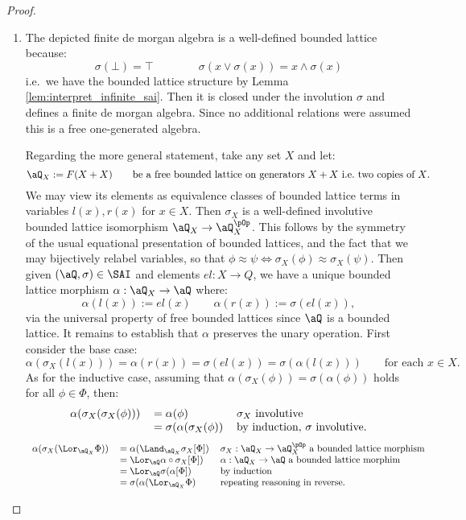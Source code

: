\documentclass{article}
\begin{document}
\begin{proof}
\item
\begin{enumerate}
\item
The depicted finite de morgan algebra is a well-defined bounded lattice because:
\[
\sigma(\bot) = \top
\qquad\qquad
\sigma(x \lor \sigma(x)) = x \land \sigma(x)
\]
i.e.\ we have the bounded lattice structure by Lemma \ref{lem:interpret_infinite_sai}. Then it is closed under the involution $\sigma$ and defines a finite de morgan algebra. Since no additional relations were assumed this is a free one-generated algebra.

\smallskip
Regarding the more general statement, take any set $X$ and let:
\[
\aQ_X := F(X + X)
\qquad
\text{be a free bounded lattice on generators $X + X$ i.e.\ two copies of $X$.}
\]
We may view its elements as equivalence classes of bounded lattice terms in variables $l(x), r(x)$ for $x \in X$. Then $\sigma_X$ is a well-defined involutive bounded lattice isomorphism $\aQ_X \to \aQ_X^{\pOp}$. This follows by the symmetry of the usual equational presentation of bounded lattices, and the fact that we may bijectively relabel variables, so that $\phi \approx \psi \iff \sigma_X(\phi) \approx \sigma_X(\psi)$. Then given $(\aQ,\sigma) \in \SAI$ and elements $el : X \to Q$, we have a unique bounded lattice morphism $\alpha : \aQ_X \to \aQ$ where:
\[
\alpha(l(x)) := el(x)
\qquad
\alpha(r(x)) := \sigma(el(x)),
\]
via the universal property of free bounded lattices since $\aQ$ is a bounded lattice. It remains to establish that $\alpha$ preserves the unary operation. First consider the base case:
\[
\alpha(\sigma_X(l(x))) = \alpha(r(x)) = \sigma(el(x)) = \sigma(\alpha(l(x)))
\qquad
\text{for each $x \in X$.}
\]
As for the inductive case, assuming that $\alpha(\sigma_X(\phi)) = \sigma(\alpha(\phi))$ holds for all $\phi \in \Phi$, then:
\[
\begin{tabular}{lll}
$\alpha(\sigma_X(\sigma_X(\phi)))$
&
$= \alpha(\phi)$
& $\sigma_X$ involutive
\\&
$= \sigma(\alpha(\sigma_X(\phi))$
& by induction, $\sigma$ involutive.
\end{tabular}
\]
\[
\begin{tabular}{lll}
$\alpha(\sigma_X(\Lor_{\aQ_X} \Phi))$
&
$= \alpha(\Land_{\aQ_X} \sigma_X[\Phi])$
& $\sigma_X : \aQ_X \to \aQ_X^{\pOp}$ a bounded lattice morphism
\\&
$= \Lor_\aQ \alpha \circ \sigma_X [\Phi])$
& $\alpha : \aQ_X \to \aQ$ a bounded lattice morphim
\\&
$= \Lor_\aQ \sigma(\alpha[\Phi])$
& by induction
\\&
$= \sigma(\alpha(\Lor_{\aQ_X} \Phi)$
& repeating reasoning in reverse.
\end{tabular}
\]



\end{enumerate}
\end{proof}
\end{document}

